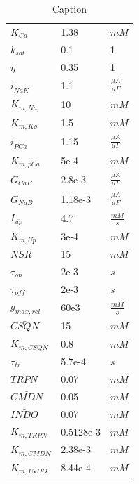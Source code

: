 \documentclass[fleqn,10pt]{physiome}
\begin{document}
\begin{table}[]
\begin{tabular}{|l|l|l|}
    $K_{Ca}$& 1.38 & $mM$ \\ 
    $k_{sat}$ & 0.1 & 1 \\ 
    $\eta$ & 0.35 & 1 \\ 
    $i_{\bar{NaK}}$ & 1.1 & $\frac{\mu A}{\mu F}$ \\ 
    $K_{m,Na_i}$ & 10 & $mM$ \\ 
    $K_{m,Ko}$ & 1.5 & $mM$ \\ 
    $i_{\bar{PCa}}$ & 1.15 & $\frac{\mu A}{\mu F}$ \\ 
    $K_{m,pCa}$ & 5e-4 & $mM$ \\ 
    $G_{CaB}$ & 2.8e-3 & $\frac{\mu A}{\mu F}$ \\ 
    $G_{NaB}$ & 1.18e-3 & $\frac{\mu A}{\mu F}$ \\ 
    $I_{\bar{up}}$ & 4.7 & $\frac{mM}{s}$ \\ 
    $K_{m,Up}$ & 3e-4 & $mM$ \\ 
    $\bar{NSR}$ & 15 & $mM$ \\ 
    $\tau_{on}$ & 2e-3 & $s$ \\ 
    $\tau_{off}$ & 2e-3 & $s$ \\ 
    $g_{max,rel}$ & 60e3 & $\frac{mM}{s}$ \\ 
    $\bar{CSQN}$ & 15 & $mM$ \\ 
    $K_{m,CSQN}$ & 0.8 & $mM$ \\ 
    $\tau_{tr}$ & 5.7e-4 & $s$ \\ 
    $\bar{TRPN}$ & 0.07 & $mM$ \\ 
    $\bar{CMDN}$ & 0.05 & $mM$ \\ 
    $\bar{INDO}$ & 0.07 & $mM$ \\ 
    $K_{m,TRPN}$ & 0.5128e-3 & $mM$ \\ 
    $K_{m,CMDN}$ & 2.38e-3 & $mM$ \\ 
    $K_{m,INDO}$ & 8.44e-4 & $mM$ \\ 
    \hline
    \end{tabular}
        \caption{Caption}
        \label{tab:my_label}
    \end{table}
\fi
\end{document}
